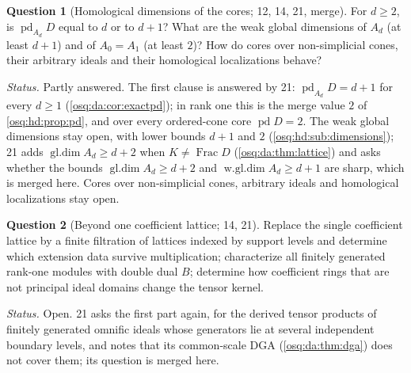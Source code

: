 \documentclass[11pt,letterpaper]{article}
\numberwithin{equation}{section}
\theoremstyle{definition}
\newtheorem{question}[question]{Question}
\theoremstyle{remark}
\theoremstyle{plain}
\newcommand{\Frac}{\operatorname{Frac}}
\newcommand{\pd}{\operatorname{pd}}
\begin{document}
\begin{question}[Homological dimensions of the cores; 12, 14, 21, merge]\label{osq:hd:q:cores}
For $d\ge2$, is $\pd_{A_d}D$ equal to $d$ or to $d+1$? What are the weak global dimensions of $A_d$ (at least $d+1$) and of
$A_0=A_1$ (at least $2$)? How do cores over non-simplicial cones, their arbitrary ideals and their homological
localizations behave?
\end{question}
\emph{Status.} Partly answered. The first clause is answered by 21: $\pd_{A_d}D=d+1$ for every $d\ge1$ (\cref{osq:da:cor:exactpd}); in rank
one this is the merge value $2$ of \cref{osq:hd:prop:pd}, and over every ordered-cone core $\pd D=2$. The weak global dimensions stay open,
with lower bounds $d+1$ and $2$ (\cref{osq:hd:sub:dimensions}); 21 adds $\operatorname{gl.dim}A_d\ge d+2$ when $K\ne\Frac D$
(\cref{osq:da:thm:lattice}) and asks whether the bounds $\operatorname{gl.dim}A_d\ge d+2$ and $\operatorname{w.gl.dim}A_d\ge d+1$ are sharp,
which is merged here. Cores over non-simplicial cones, arbitrary ideals and homological localizations stay open.

\begin{question}[Beyond one coefficient lattice; 14, 21]\label{osq:tn:q:lattices}
Replace the single coefficient lattice by a finite filtration of lattices indexed by support levels and determine which
extension data survive multiplication; characterize all finitely generated rank-one modules with double dual $B$; determine
how coefficient rings that are not principal ideal domains change the tensor kernel.
\end{question}
\emph{Status.} Open. 21 asks the first part again, for the derived tensor products of finitely generated omnific ideals whose generators
lie at several independent boundary levels, and notes that its common-scale DGA (\cref{osq:da:thm:dga}) does not cover them; its question is
merged here.
\end{document}
